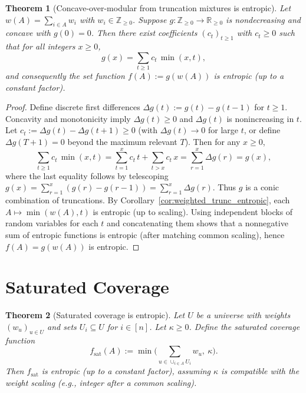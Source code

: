 \documentclass[conference]{IEEEtran}
\newtheorem{theorem}{Theorem}
\theoremstyle{definition}
\theoremstyle{remark}
\begin{document}
\begin{theorem}[Concave-over-modular from truncation mixtures is entropic]
\label{thm:concave_over_modular_entropic}
Let $w(A)=\sum_{i\in A} w_i$ with $w_i\in\mathbb{Z}_{\ge 0}$. Suppose $g:\mathbb{Z}_{\ge 0}\to\mathbb{R}_{\ge 0}$
is nondecreasing and concave with $g(0)=0$. Then there exist coefficients $(c_t)_{t\ge 1}$ with $c_t\ge 0$ such that
for all integers $x\ge 0$,
\[
g(x)=\sum_{t\ge 1} c_t\,\min(x,t),
\]
and consequently the set function $f(A):=g(w(A))$ is entropic (up to a constant factor).
\end{theorem}

\begin{proof}
Define discrete first differences $\Delta g(t):=g(t)-g(t-1)$ for $t\ge 1$.
Concavity and monotonicity imply $\Delta g(t)\ge 0$ and $\Delta g(t)$ is nonincreasing in $t$.
Let $c_t := \Delta g(t)-\Delta g(t+1)\ge 0$ (with $\Delta g(t)\to 0$ for large $t$, or define $\Delta g(T+1)=0$
beyond the maximum relevant $T$).
Then for any $x\ge 0$,
\[
\sum_{t\ge 1} c_t\,\min(x,t)
=\sum_{t=1}^{x} c_t\,t + \sum_{t>x} c_t\,x
=\sum_{r=1}^{x} \Delta g(r)
=g(x),
\]
where the last equality follows by telescoping $g(x)=\sum_{r=1}^x (g(r)-g(r-1))=\sum_{r=1}^x \Delta g(r)$.
Thus $g$ is a conic combination of truncations.
By Corollary~\ref{cor:weighted_trunc_entropic}, each $A\mapsto \min(w(A),t)$ is entropic (up to scaling).
Using independent blocks of random variables for each $t$ and concatenating them shows that a nonnegative sum of
entropic functions is entropic (after matching common scaling), hence $f(A)=g(w(A))$ is entropic.
\end{proof}

\section{Saturated Coverage} \label{sec:saturatedcov}

\begin{theorem}[Saturated coverage is entropic]
\label{thm:saturated_coverage_entropic}
Let $U$ be a universe with weights $(w_u)_{u\in U}$ and sets $U_i\subseteq U$ for $i\in[n]$.
Let $\kappa\ge 0$. Define the \emph{saturated coverage} function
\[
f_{\mathrm{sat}}(A) := \min\Big(\sum_{u\in \cup_{i\in A} U_i} w_u,\ \kappa\Big).
\]
Then $f_{\mathrm{sat}}$ is entropic (up to a constant factor), assuming $\kappa$ is compatible with the
weight scaling (e.g., integer after a common scaling).
\end{theorem}
\end{document}
